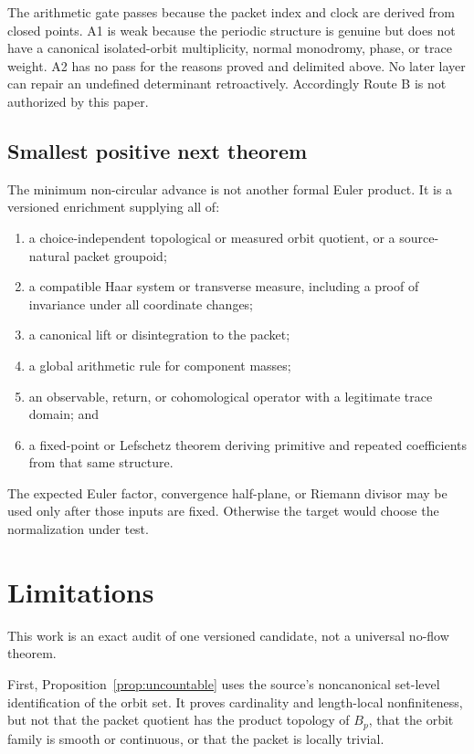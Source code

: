 \documentclass[11pt]{article}
\theoremstyle{definition}
\theoremstyle{remark}
\begin{document}
The arithmetic gate passes because the packet index and clock are derived
from closed points.  A1 is weak because the periodic structure is genuine but
does not have a canonical isolated-orbit multiplicity, normal monodromy,
phase, or trace weight.  A2 has no pass for the reasons proved and delimited
above.  No later layer can repair an undefined determinant retroactively.
Accordingly Route B is not authorized by this paper.

\subsection{Smallest positive next theorem}

The minimum non-circular advance is not another formal Euler product.  It is
a versioned enrichment supplying all of:
\begin{enumerate}[leftmargin=*,itemsep=2pt]
 \item a choice-independent topological or measured orbit quotient, or a
 source-natural packet groupoid;
 \item a compatible Haar system or transverse measure, including a proof of
 invariance under all coordinate changes;
 \item a canonical lift or disintegration to the packet;
 \item a global arithmetic rule for component masses;
 \item an observable, return, or cohomological operator with a legitimate
 trace domain; and
 \item a fixed-point or Lefschetz theorem deriving primitive and repeated
 coefficients from that same structure.
\end{enumerate}
The expected Euler factor, convergence half-plane, or Riemann divisor may be
used only after those inputs are fixed.  Otherwise the target would choose the
normalization under test.

\section{Limitations}
\label{sec:limitations}

This work is an exact audit of one versioned candidate, not a universal
no-flow theorem.

First, Proposition~\ref{prop:uncountable} uses the source's noncanonical
set-level identification of the orbit set.  It proves cardinality and
length-local nonfiniteness, but not that the packet quotient has the product
topology of \(B_p\), that the orbit family is smooth or continuous, or that
the packet is locally trivial.
\end{document}
